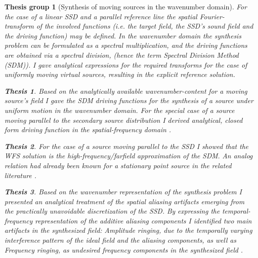 \documentclass[10pt,twoside]{article}
\theoremstyle{thesisgroupstyle}
\newtheorem{thesisgroup}{Thesis group}
\theoremstyle{indented}
\newtheorem{thesis}{Thesis}[thesisgroup]
\begin{document}
\begin{thesisgroup}[Synthesis of moving sources in the wavenumber domain]
For the case of a linear SSD and a parallel reference line the spatial Fourier-transform of the involved functions (i.e. the target field, the SSD's sound field and the driving function) may be defined.
In the wavenumber domain the synthesis problem can be formulated as a spectral multiplication, and the driving functions are obtained via a spectral division, (hence the term \emph{Spectral Division Method (SDM)}).
I gave analytical expressions for the required transforms for the case of uniformly moving virtual sources, resulting in the explicit reference solution.
\begin{thesis} 
Based on the analytically available wavenumber-content for a moving source's field I gave the SDM driving functions for the synthesis of a source under uniform motion in the wavenumber domain.
For the special case of a source moving parallel to the secondary source distribution I derived analytical, closed form driving function in the spatial-frequency domain \cite{Firtha2014:daga_booklet, Firtha2014:isma_booklet, firtha2015sound_booklet}.\end{thesis}
\begin{thesis} 
For the case of a source moving parallel to the SSD I showed that the WFS solution is the high-frequency/farfield approximation of the SDM. An analog relation had already been known for a stationary point source in the related literature \cite{firtha2015sound_booklet}.
\end{thesis}
\begin{thesis} 
Based on the wavenumber representation of the synthesis problem I presented an analytical treatment of the spatial aliasing artifacts emerging from the practically unavoidable discretization of the SSD.
By expressing the temporal-frequency representation of the additive aliasing components I identified two main artifacts in the synthesized field: \emph{Amplitude ringing}, due to the temporally varying interference pattern of the ideal field and the aliasing components, as well as \emph{Frequency ringing}, as undesired frequency components in the synthesized field \cite{firtha2016:daga_booklet}.

\end{thesis}
\end{thesisgroup}
\end{document}
